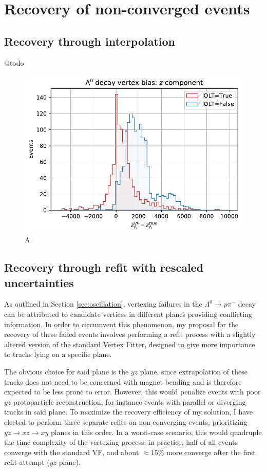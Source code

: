 \section{Recovery of non-converged events}
\label{sec:recovery_general}

\subsection{Recovery through interpolation}
@todo

\begin{figure}[t]
	\centering
	\includegraphics[width=.6\textwidth]{graphics/03-vertex_reconstruction/iolt_lambda_endvertex_z_bias.pdf}
	\caption{A.}
\end{figure}

\subsection{Recovery through refit with rescaled uncertainties}
\label{sec:blowup_matrix}
As outlined in Section \ref{sec:oscillation}, vertexing failures in the $\Lambda^0 \rightarrow p\pi^-$ decay can be attributed to candidate vertices in different planes providing conflicting information.
In order to circumvent this phenomenon, my proposal for the recovery of these failed events involves performing a refit process with a slightly altered version of the standard Vertex Fitter, designed to give more importance to tracks lying on a specific plane.

The obvious choice for said plane is the $yz$ plane, since extrapolation of these tracks does not need to be concerned with magnet bending and is therefore expected to be less prone to error.
However, this would penalize events with poor $yz$ protoparticle reconstruction, for instance events with parallel or diverging tracks in said plane.
To maximize the recovery efficiency of my solution, I have elected to perform three separate refits on non-converging events, prioritizing $yz \rightarrow xz \rightarrow xy$ planes in this order.
In a worst-case scenario, this would quadruple the time complexity of the vertexing process; in practice, half of all events converge with the standard VF, and about $\approx 15\%$ more converge after the first refit attempt ($yz$ plane).

